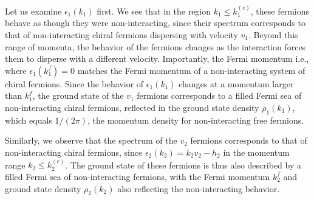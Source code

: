 \documentclass[aps,pra,
superscriptaddress,
reprint,twocolumn,preprintnumbers,
amsmath,amssymb,
nofootinbib]{revtex4-1}
\begin{document}
Let us examine $\epsilon_1(k_1)$ first. We see that in the region $k_1 \leq k_1^{(c)}$, these fermions behave as though they were non-interacting, since their spectrum corresponds to that of non-interacting chiral fermions dispersing with velocity $v_1$. Beyond this range of momenta, the behavior of the fermions changes as the interaction forces them to disperse with a different velocity. Importantly, the Fermi momentum i.e., where $\epsilon_1(k_1^f) = 0$ 
matches the Fermi momentum of a non-interacting system of chiral fermions. Since the behavior of $\epsilon_1(k_1)$ changes at a momentum larger than $k_1^f$, the ground state of the $v_1$ fermions corresponds to a filled Fermi sea of non-interacting chiral fermions, reflected in the ground state density $\rho_1(k_1)$, which equals $1/(2\pi)$, the momentum density for non-interacting free fermions.

Similarly, we observe that the spectrum of the $v_2$ fermions corresponds to that of non-interacting chiral fermions, since $\epsilon_2(k_2) = k_2 v_2 - h_2$ in the momentum range $k_2 \leq k_2^{(c)}$. The ground state of these fermions is thus also described by a filled Fermi sea of non-interacting fermions, with the Fermi momentum $k_2^f$ and ground state density $\rho_2(k_2)$ also reflecting the non-interacting behavior.        
\end{document}
